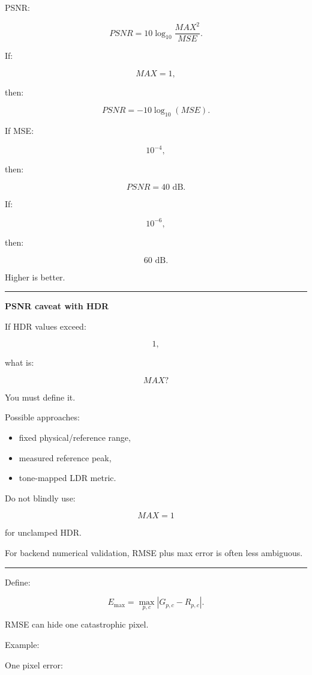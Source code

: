 PSNR:

\[
\boxed{
PSNR
=
10\log_{10}
\frac{MAX^2}{MSE}.
}
\]

If:

\[
MAX=1,
\]

then:

\[
PSNR
=
-10\log_{10}(MSE).
\]

If MSE:

\[
10^{-4},
\]

then:

\[
PSNR=40\text{ dB}.
\]

If:

\[
10^{-6},
\]

then:

\[
60\text{ dB}.
\]

Higher is better.

\begin{center}\rule{0.5\linewidth}{0.5pt}\end{center}

\textbf{PSNR caveat with HDR}

If HDR values exceed:

\[
1,
\]

what is:

\[
MAX?
\]

You must define it.

Possible approaches:

\begin{itemize}
\tightlist
\item
  fixed physical/reference range,
\item
  measured reference peak,
\item
  tone-mapped LDR metric.
\end{itemize}

Do not blindly use:

\[
MAX=1
\]

for unclamped HDR.

For backend numerical validation, RMSE plus max error is often less ambiguous.

\begin{center}\rule{0.5\linewidth}{0.5pt}\end{center}

Define:

\[
\boxed{
E_{\max}
=
\max_{p,c}
|G_{p,c}-R_{p,c}|.
}
\]

RMSE can hide one catastrophic pixel.

Example:

One pixel error:


